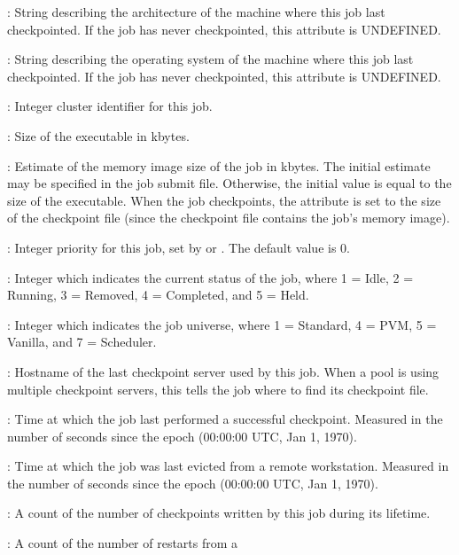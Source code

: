 \begin{description}
%
%
\item[\AdAttr{CkptArch}] : String describing the architecture of the machine
where this job last checkpointed.  If the job has never checkpointed,
this attribute is UNDEFINED.
%
\item[\AdAttr{CkptOpSys}] : String describing the operating system of
the machine where this job last checkpointed.  If the job has never
checkpointed, this attribute is UNDEFINED.
%
\item[\AdAttr{ClusterId}] : Integer cluster identifier for this job.
%
\item[\AdAttr{ExecutableSize}] : Size of the executable in kbytes.
%
\item[\AdAttr{ImageSize}] : Estimate of the memory image size of the
job in kbytes.  The initial estimate may be specified in the job
submit file.  Otherwise, the initial value is equal to the size of the
executable.  When the job checkpoints, the 
attribute is set to the size of the checkpoint file (since the
checkpoint file contains the job's memory image).
%
\item[\AdAttr{JobPrio}] : Integer priority for this job, set by
 or .  The default value is 0.
%
\item[\AdAttr{JobStatus}] : Integer which indicates the current
status of the job, where 1 = Idle, 2 = Running, 3 = Removed, 4 =
Completed, and 5 = Held.
%
\item[\AdAttr{JobUniverse}] : Integer which indicates the job
universe, where 1 = Standard, 4 = PVM, 5 = Vanilla, and 7 = Scheduler.
%
\item[\AdAttr{LastCkptServer}] : Hostname of the last checkpoint
server used by this job.  When a pool is using multiple checkpoint
servers, this tells the job where to find its checkpoint file.
%
\item[\AdAttr{LastCkptTime}] : Time at which the job last performed a
successful checkpoint.  Measured in the number of seconds since the
epoch (00:00:00 UTC, Jan 1, 1970).
%
\item[\AdAttr{LastVacateTime}] : Time at which the job was last
evicted from a remote workstation.  Measured in the number of seconds
since the epoch (00:00:00 UTC, Jan 1, 1970).
%
\item[\AdAttr{NumCkpts}] : A count of the number of checkpoints
written by this job during its lifetime.
%
\item[\AdAttr{NumRestarts}] : A count of the number of restarts from a

\end{description}
